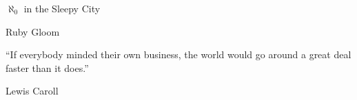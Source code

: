 \begin{BookTitle}
$\aleph_0$ in the Sleepy City
\end{BookTitle}
\begin{Author}
Ruby Gloom
\end{Author}
\begin{Epigraph}
``If everybody minded their own business, the world would go around a great deal faster than it does.''
\end{Epigraph}
\begin{EpigraphSource}
\textemdash{} Lewis Caroll
\end{EpigraphSource}
